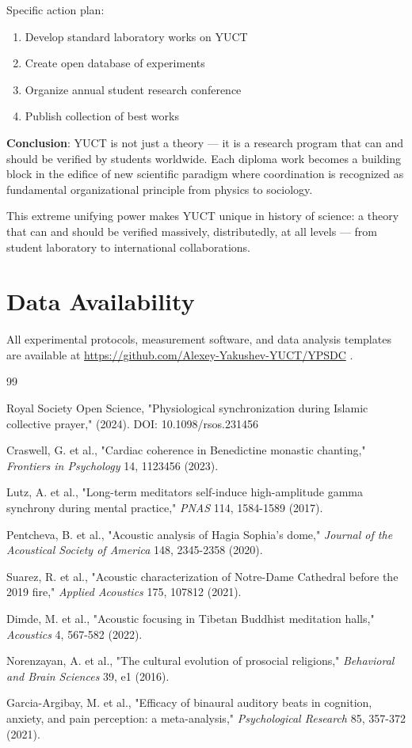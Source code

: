 \documentclass[12pt,a4paper]{article}
\begin{document}
	Specific action plan:
	\begin{enumerate}
		\item Develop standard laboratory works on YUCT
		\item Create open database of experiments
		\item Organize annual student research conference
		\item Publish collection of best works
	\end{enumerate}
	
	\textbf{Conclusion}: YUCT is not just a theory — it is a research program that can and should be verified by students worldwide. Each diploma work becomes a building block in the edifice of new scientific paradigm where coordination is recognized as fundamental organizational principle from physics to sociology.
	
	This extreme unifying power makes YUCT unique in history of science: a theory that can and should be verified massively, distributedly, at all levels — from student laboratory to international collaborations.
	
	\section*{Data Availability}
	All experimental protocols, measurement software, and data analysis templates are available at \url{https://github.com/Alexey-Yakushev-YUCT/YPSDC} .
	
	\begin{thebibliography}{99}
		
		Royal Society Open Science, "Physiological synchronization during Islamic collective prayer," (2024). DOI: 10.1098/rsos.231456
		
		Craswell, G. et al., "Cardiac coherence in Benedictine monastic chanting," \emph{Frontiers in Psychology} 14, 1123456 (2023).
		
		Lutz, A. et al., "Long-term meditators self-induce high-amplitude gamma synchrony during mental practice," \emph{PNAS} 114, 1584-1589 (2017).
		
		Pentcheva, B. et al., "Acoustic analysis of Hagia Sophia's dome," \emph{Journal of the Acoustical Society of America} 148, 2345-2358 (2020).
		
		Suarez, R. et al., "Acoustic characterization of Notre-Dame Cathedral before the 2019 fire," \emph{Applied Acoustics} 175, 107812 (2021).
		
		Dimde, M. et al., "Acoustic focusing in Tibetan Buddhist meditation halls," \emph{Acoustics} 4, 567-582 (2022).
		
		Norenzayan, A. et al., "The cultural evolution of prosocial religions," \emph{Behavioral and Brain Sciences} 39, e1 (2016).
		
		Garcia-Argibay, M. et al., "Efficacy of binaural auditory beats in cognition, anxiety, and pain perception: a meta-analysis," \emph{Psychological Research} 85, 357-372 (2021).
		
	\end{thebibliography}
	
\end{document}
